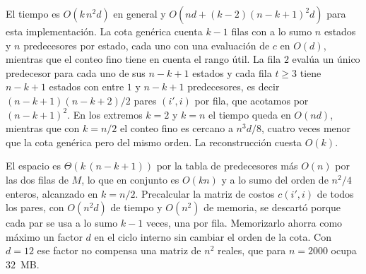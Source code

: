 El tiempo es $O(k\, n^2 d)$ en general y $O\!\left(n d + (k-2)(n-k+1)^2 d\right)$ para esta implementación. La cota genérica cuenta $k-1$ filas con a lo sumo $n$ estados y $n$ predecesores por estado, cada uno con una evaluación de $c$ en $O(d)$, mientras que el conteo fino tiene en cuenta el rango útil. La fila $2$ evalúa un único predecesor para cada uno de sus $n-k+1$ estados y cada fila $t \ge 3$ tiene $n-k+1$ estados con entre $1$ y $n-k+1$ predecesores, es decir $(n-k+1)(n-k+2)/2$ pares $(i', i)$ por fila, que acotamos por $(n-k+1)^2$. En los extremos $k = 2$ y $k = n$ el tiempo queda en $O(n d)$, mientras que con $k = n/2$ el conteo fino es cercano a $n^3 d / 8$, cuatro veces menor que la cota genérica pero del mismo orden. La reconstrucción cuesta $O(k)$.

El espacio es $\Theta(k\,(n-k+1))$ por la tabla de predecesores más $O(n)$ por las dos filas de $M$, lo que en conjunto es $O(k n)$ y a lo sumo del orden de $n^2 / 4$ enteros, alcanzado en $k = n/2$. Precalcular la matriz de costos $c(i', i)$ de todos los pares, con $O(n^2 d)$ de tiempo y $O(n^2)$ de memoria, se descartó porque cada par se usa a lo sumo $k-1$ veces, una por fila. Memorizarlo ahorra como máximo un factor $d$ en el ciclo interno sin cambiar el orden de la cota. Con $d = 12$ ese factor no compensa una matriz de $n^2$ reales, que para $n = 2000$ ocupa $32$~MB.
